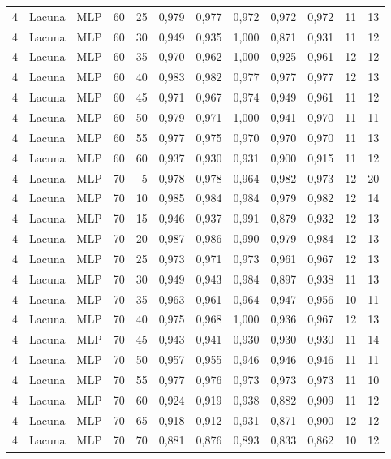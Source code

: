 \begin{longtable}{@{}rllrrrrrrrrr@{}}
4 & Lacuna & MLP & 60 & 25 & 0,979 & 0,977 & 0,972 & 0,972 & 0,972 & 11 & 13 \\
4 & Lacuna & MLP & 60 & 30 & 0,949 & 0,935 & 1,000 & 0,871 & 0,931 & 11 & 12 \\
4 & Lacuna & MLP & 60 & 35 & 0,970 & 0,962 & 1,000 & 0,925 & 0,961 & 12 & 12 \\
4 & Lacuna & MLP & 60 & 40 & 0,983 & 0,982 & 0,977 & 0,977 & 0,977 & 12 & 13 \\
4 & Lacuna & MLP & 60 & 45 & 0,971 & 0,967 & 0,974 & 0,949 & 0,961 & 11 & 12 \\
4 & Lacuna & MLP & 60 & 50 & 0,979 & 0,971 & 1,000 & 0,941 & 0,970 & 11 & 11 \\
4 & Lacuna & MLP & 60 & 55 & 0,977 & 0,975 & 0,970 & 0,970 & 0,970 & 11 & 13 \\
4 & Lacuna & MLP & 60 & 60 & 0,937 & 0,930 & 0,931 & 0,900 & 0,915 & 11 & 12 \\
4 & Lacuna & MLP & 70 & 5 & 0,978 & 0,978 & 0,964 & 0,982 & 0,973 & 12 & 20 \\
4 & Lacuna & MLP & 70 & 10 & 0,985 & 0,984 & 0,984 & 0,979 & 0,982 & 12 & 14 \\
4 & Lacuna & MLP & 70 & 15 & 0,946 & 0,937 & 0,991 & 0,879 & 0,932 & 12 & 13 \\
4 & Lacuna & MLP & 70 & 20 & 0,987 & 0,986 & 0,990 & 0,979 & 0,984 & 12 & 13 \\
4 & Lacuna & MLP & 70 & 25 & 0,973 & 0,971 & 0,973 & 0,961 & 0,967 & 12 & 13 \\
4 & Lacuna & MLP & 70 & 30 & 0,949 & 0,943 & 0,984 & 0,897 & 0,938 & 11 & 13 \\
4 & Lacuna & MLP & 70 & 35 & 0,963 & 0,961 & 0,964 & 0,947 & 0,956 & 10 & 11 \\
4 & Lacuna & MLP & 70 & 40 & 0,975 & 0,968 & 1,000 & 0,936 & 0,967 & 12 & 13 \\
4 & Lacuna & MLP & 70 & 45 & 0,943 & 0,941 & 0,930 & 0,930 & 0,930 & 11 & 14 \\
4 & Lacuna & MLP & 70 & 50 & 0,957 & 0,955 & 0,946 & 0,946 & 0,946 & 11 & 11 \\
4 & Lacuna & MLP & 70 & 55 & 0,977 & 0,976 & 0,973 & 0,973 & 0,973 & 11 & 10 \\
4 & Lacuna & MLP & 70 & 60 & 0,924 & 0,919 & 0,938 & 0,882 & 0,909 & 11 & 12 \\
4 & Lacuna & MLP & 70 & 65 & 0,918 & 0,912 & 0,931 & 0,871 & 0,900 & 12 & 12 \\
4 & Lacuna & MLP & 70 & 70 & 0,881 & 0,876 & 0,893 & 0,833 & 0,862 & 10 & 12 \\

\end{longtable}
